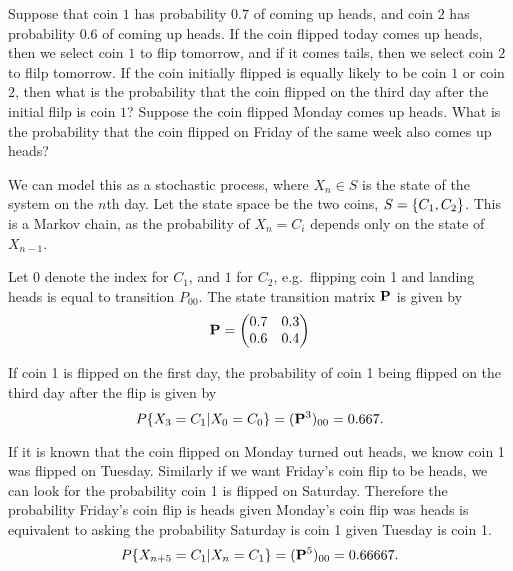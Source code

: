 \documentclass{article}
\begin{document}
    \nextproblem

    \begin{problem}
        Suppose that coin $1$ has probability $0.7$ of coming up heads, and coin $2$ has probability $0.6$ of coming up heads. If the coin flipped today comes up heads, then we select coin $1$ to flip tomorrow, and if it comes tails, then we select coin $2$ to flilp tomorrow. If the coin initially flipped is equally likely to be coin $1$ or coin $2$, then what is the probability that the coin flipped on the third day after the initial flilp is coin $1$? Suppose the coin flipped Monday comes up heads. What is the probability that the coin flipped on Friday of the same week also comes up heads?
    \end{problem}

    \begin{solution}
        We can model this as a stochastic process, where $X_n \in S$ is the state of the system on the $n$th day. Let the state space be the two coins, $S = \{C_1, C_2\}$. This is a Markov chain, as the probability of $X_n = C_i$ depends only on the state of $X_{n-1}$.

        Let $0$ denote the index for $C_1$, and $1$ for $C_2$, e.g.~flipping coin 1 and landing heads is equal to transition $P_{00}$. The state transition matrix $\vb{P}$ is given by
        \begin{equation}
            \vb{P} = \begin{pmatrix} 0.7 & 0.3 \\ 0.6 & 0.4 \end{pmatrix}
        \end{equation}

        If coin 1 is flipped on the first day, the probability of coin 1 being flipped on the third day after the flip is given by
        \begin{equation}
            P\{X_3 = C_1 | X_0 = C_0\} = (\vb{P}^3)_{00} = 0.667.
        \end{equation}

        If it is known that the coin flipped on Monday turned out heads, we know coin 1 was flipped on Tuesday. Similarly if we want Friday's coin flip to be heads, we can look for the probability coin 1 is flipped on Saturday. Therefore the probability Friday's coin flip is heads given Monday's coin flip was heads is equivalent to asking the probability Saturday is coin 1 given Tuesday is coin 1.
        \begin{equation}
            P\{X_{n+5}=C_1|X_{n} =C_1\} = (\vb{P}^5)_{00} = 0.66667.
        \end{equation}
    \end{solution}
\end{document}
